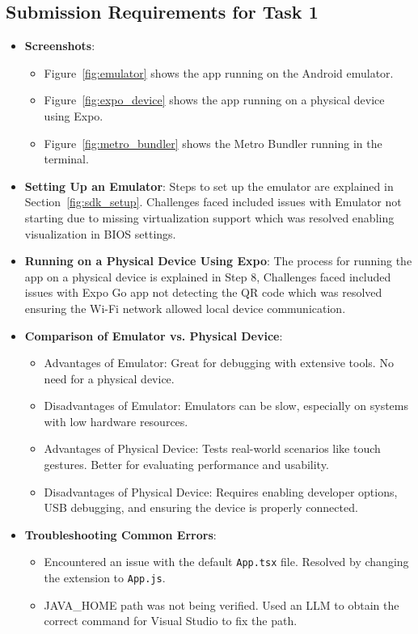 \documentclass{article}
\begin{document}
\subsection{Submission Requirements for Task 1}
\begin{itemize}
    \item \textbf{Screenshots}: 
    \begin{itemize}
        \item Figure~\ref{fig:emulator} shows the app running on the Android emulator.
        \item Figure~\ref{fig:expo_device} shows the app running on a physical device using Expo.
        \item Figure~\ref{fig:metro_bundler} shows the Metro Bundler running in the terminal.
    \end{itemize}
    \item \textbf{Setting Up an Emulator}: Steps to set up the emulator are explained in Section~\ref{fig:sdk_setup}. Challenges faced included issues with Emulator not starting due to missing virtualization support which was resolved enabling visualization in BIOS settings.
    \item \textbf{Running on a Physical Device Using Expo}: The process for running the app on a physical device is explained in Step 8, Challenges faced included issues with Expo Go app not detecting the QR code which was resolved ensuring the Wi-Fi network allowed local device communication.
    \item \textbf{Comparison of Emulator vs. Physical Device}: 
    \begin{itemize}
        \item Advantages of Emulator: Great for debugging with extensive tools. No need for a physical device.
        \item Disadvantages of Emulator: Emulators can be slow, especially on systems with low hardware resources.
        \item Advantages of Physical Device: Tests real-world scenarios like touch gestures. Better for evaluating performance and usability.
        \item Disadvantages of Physical Device: Requires enabling developer options, USB debugging, and ensuring the device is properly connected.
    \end{itemize}
    \item \textbf{Troubleshooting Common Errors}: 
    \begin{itemize}
        \item Encountered an issue with the default \texttt{App.tsx} file. Resolved by changing the extension to \texttt{App.js}.
        \item JAVA\_HOME path was not being verified. Used an LLM to obtain the correct command for Visual Studio to fix the path.
    \end{itemize}
\end{itemize}
\end{document}
